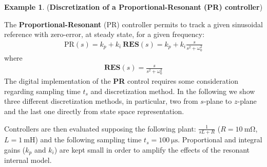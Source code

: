\documentclass[11pt,a4paper,oneside]{book}
\numberwithin{equation}{section}
\theoremstyle{it}
\theoremstyle{definition}
\newtheorem{example}{Example}[chapter]
\begin{document}
\vspace{5mm}
\begin{example}(\textbf{Discretization of a Proportional-Resonant (PR) 
controller})

	The \textbf{Proportional-Resonant} (PR) controller permits to track a given 
	sinusoidal reference with zero-error, at steady state, for a given  
	frequency:
	\begin{equation}\label{eqRESP1}
		\begin{aligned}
			\text{PR}(s) = k_p + k_i\ \textbf{RES}(s) = k_p + k_i 
			\frac{s}{s^2+\omega_0^2}
		\end{aligned}
	\end{equation}
where
	\begin{equation}
		\begin{aligned}
			\textbf{RES}(s) = \frac{s}{s^2+\omega_0^2}
		\end{aligned}
	\end{equation}
	The digital implementation of the \textbf{PR} control requires some consideration regarding sampling time $t_s$ and discretization method. In the following we show three different discretization methods, in particular, two from $s$-plane to $z$-plane and the last one directly from state space representation.
	
	Controllers are then evaluated supposing the following plant: $\frac{1}{sL +R}$ ($R = \SI{10}{\milli\ohm}$, $L = \SI{1}{\milli\henry}$) and the following sampling time $t_s = \SI{100}{\micro\second}$.  Proportional and integral gains ($k_p$ and $k_i$) are kept small in order to amplify the effects of the resonant internal model.
	

\end{example}
\end{document}

